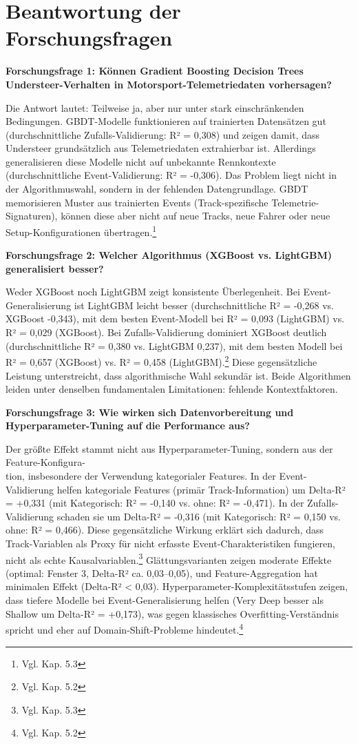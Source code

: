 \section{Beantwortung der Forschungsfragen}

\textbf{Forschungsfrage 1: Können Gradient Boosting Decision Trees Understeer-Verhalten in Motorsport-Telemetriedaten vorhersagen?}

Die Antwort lautet: Teilweise ja, aber nur unter stark einschränkenden Bedingungen. GBDT-Modelle funktionieren auf trainierten Datensätzen gut (durchschnittliche Zufalls-Validierung: R² = 0,308) und zeigen damit, dass Understeer grundsätzlich aus Telemetriedaten extrahierbar ist. Allerdings generalisieren diese Modelle nicht auf unbekannte Rennkontexte (durchschnittliche Event-Validierung: R² = -0,306). Das Problem liegt nicht in der Algorithmuswahl, sondern in der fehlenden Datengrundlage. GBDT memorisieren Muster aus trainierten Events (Track-spezifische Telemetrie-Signaturen), können diese aber nicht auf neue Tracks, neue Fahrer oder neue Setup-Konfigurationen übertragen.\footnote{Vgl. Kap. 5.3}

\textbf{Forschungsfrage 2: Welcher Algorithmus (XGBoost vs. LightGBM) generalisiert besser?}

Weder XGBoost noch LightGBM zeigt konsistente Überlegenheit. Bei Event-Generalisierung ist LightGBM leicht besser (durchschnittliche R² = -0,268 vs. XGBoost -0,343), mit dem besten Event-Modell bei R² = 0,093 (LightGBM) vs. R² = 0,029 (XGBoost). Bei Zufalls-Validierung dominiert XGBoost deutlich (durchschnittliche R² = 0,380 vs. LightGBM 0,237), mit dem besten Modell bei R² = 0,657 (XGBoost) vs. R² = 0,458 (LightGBM).\footnote{Vgl. Kap. 5.2} Diese gegensätzliche Leistung unterstreicht, dass algorithmische Wahl sekundär ist. Beide Algorithmen leiden unter denselben fundamentalen Limitationen: fehlende Kontextfaktoren.

\textbf{Forschungsfrage 3: Wie wirken sich Datenvorbereitung und Hyperparameter-Tuning auf die Performance aus?}

Der größte Effekt stammt nicht aus Hyperparameter-Tuning, sondern aus der Feature-Konfigura-\\tion, insbesondere der Verwendung kategorialer Features. In der Event-Validierung helfen kategoriale Features (primär Track-Information) um Delta-R² = +0,331 (mit Kategorisch: R² = -0,140 vs. ohne: R² = -0,471). In der Zufalls-Validierung schaden sie um Delta-R² = -0,316 (mit Kategorisch: R² = 0,150 vs. ohne: R² = 0,466). Diese gegensätzliche Wirkung erklärt sich dadurch, dass Track-Variablen als Proxy für nicht erfasste Event-Charakteristiken fungieren, nicht als echte Kausalvariablen.\footnote{Vgl. Kap. 5.3} Glättungsvarianten zeigen moderate Effekte (optimal: Fenster 3, Delta-R² ca. 0,03–0,05), und Feature-Aggregation hat minimalen Effekt (Delta-R² < 0,03). Hyperparameter-Komplexitätsstufen zeigen, dass tiefere Modelle bei Event-Generalisierung helfen (Very Deep besser als Shallow um Delta-R² = +0,173), was gegen klassisches Overfitting-Verständnis spricht und eher auf Domain-Shift-Probleme hindeutet.\footnote{Vgl. Kap. 5.2}



